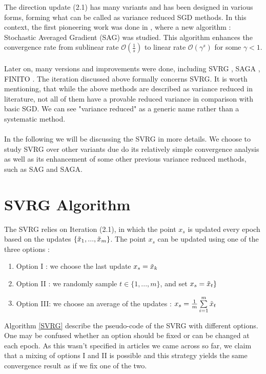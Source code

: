\documentclass[12pt]{report}
\begin{document}
The direction update (2.1) has many variants and has been designed in various forms, forming what can be called as variance reduced SGD methods. In this context, the first pioneering work was done in \cite{schmidt2017minimizing}, where a new algorithm : Stochastic Averaged Gradient (SAG) was studied. This algorithm enhances the convergence rate from sublinear rate $\mathcal{O}(\frac{1}{s})$ to linear rate $\mathcal{O}(\gamma^s)$ for some $\gamma<1$. \\
\\Later on, many versions and improvements were done, including SVRG \cite{johnson2013accelerating}, SAGA \cite{defazio2014saga}, FINITO \cite{defazio2014finito}.
The iteration discussed above formally concerns SVRG.
It is worth mentioning, that while the above methods are described as variance reduced in literature, not all of them have a provable reduced variance in comparison with basic SGD. We can see "variance reduced" as a generic name rather than a systematic method. \\
\\In the following we will be discussing the SVRG in more details. We choose to study SVRG over other variants due do its relatively simple convergence analysis as well as its enhancement of some other previous variance reduced methods, such as SAG and SAGA.


\section{SVRG Algorithm}
The SVRG relies on Iteration (2.1), in which the point $x_s$ is updated every epoch based on the updates $\{\Tilde{x}_1,...,\Tilde{x}_m\}$. The point $x_s$ can be updated using one of the three options : 
\begin{enumerate}
    \item Option I : we choose the last update $x_s=\Tilde{x}_k$
    \item Option II : we randomly sample $t\in\{1,...,m\}$, and set $x_s=\Tilde{x}_t\}$
    \item Option III: we choose an average of the updates : $x_s=\frac{1}{m}\sum\limits_{i=1}^m \Tilde{x}_t$ 
\end{enumerate}
Algorithm \ref{SVRG} describe the pseudo-code of the SVRG with different options. One may be confused whether an option should be fixed or can be changed at each epoch. As this wasn't specified in articles we came across so far, we claim that a mixing of options I and II is possible and this strategy yields the same convergence result as if we fix one of the two. 
\end{document}
